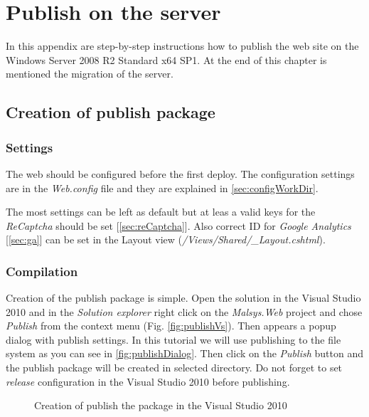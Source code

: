 
\chapter{Publish on the server}
\label{chap:publish}

In this appendix are step-by-step instructions how to publish the web site on the Windows Server 2008 R2 Standard x64 SP1.
At the end of this chapter is mentioned the migration of the server.

\section{Creation of publish package}
\label{sec:deployPackage}


\subsection{Settings}

The web should be configured before the first deploy.
The configuration settings are in the \emph{Web.config} file and they are explained in \autoref{sec:configWorkDir}.

The most settings can be left as default but at leas a valid keys for the \emph{ReCaptcha} should be set [\ref{sec:reCaptcha}].
Also correct ID for \emph{Google Analytics} [\ref{sec:ga}] can be set in the Layout view (\emph{/Views/Shared/\_Layout.cshtml}).


\subsection{Compilation}

Creation of the publish package is simple.
Open the solution in the Visual Studio 2010 and in the \emph{Solution explorer} right click on the \emph{Malsys.Web} project and chose \emph{Publish} from the context menu (Fig. \ref{fig:publishVs}).
Then appears a popup dialog with publish settings.
In this tutorial we will use publishing to the file system as you can see in \autoref{fig:publishDialog}.
Then click on the \emph{Publish} button and the publish package will be created in selected directory.
Do not forget to set \emph{release} configuration in the Visual Studio 2010 before publishing.

\begin{figure}[h!]
	\hfill
	\caption{Creation of publish the package in the Visual Studio 2010}
	\label{fig:publish}
\end{figure}
 
